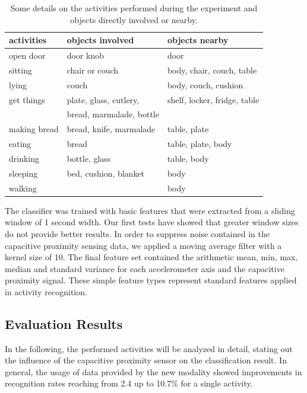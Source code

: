 \documentclass[runningheads,a4paper]{llncs}
\begin{document}
\begin{table}
	\centering
	\caption{Some details on the activities performed during the experiment and objects directly involved or nearby.}
	\setlength{\tabcolsep}{12pt}
	\begin{tabular}{lll}
		\toprule
		activities		& objects involved			& objects nearby			\\ 
		\midrule
		open door		& door knob 				& door  					\\
		sitting			& chair or couch			& body, chair, couch, table	\\
		lying			& couch						& body, couch, cushion		\\
		get things		& plate, glass, cutlery, 	& shelf, locker, fridge, table \\ 
						& bread, marmalade, bottle  & 							\\
		making bread	& bread, knife, marmalade	& table, plate 				\\
		eating			& bread						& table, plate, body		\\
		drinking 		& bottle, glass 			& table, body				\\
		sleeping		& bed, cushion, blanket		& body 						\\
		walking			& 							& body						\\
		 \bottomrule
	\end{tabular}
	\label{tab:activities}
\end{table}

The classifier was trained with basic features that were extracted from a sliding window of 1 second width. Our first tests have showed that greater window sizes do not provide better results. In order to suppress noise contained in the capacitive proximity sensing data, we applied a moving average filter with a kernel size of 10. The final feature set contained the arithmetic mean, min, max, median and standard variance for each accelerometer axis and the capacitive proximity signal. These simple feature types represent standard features applied in activity recognition. 

\subsection{Evaluation Results}
\label{sect:evaluation}

In the following, the performed activities will be analyzed in detail, stating out the influence of the capacitive proximity sensor on the classification result. In general, the usage of data provided by the new modality showed improvements in recognition rates reaching from 2.4 up to 10.7\% for a single activity.
\end{document}
